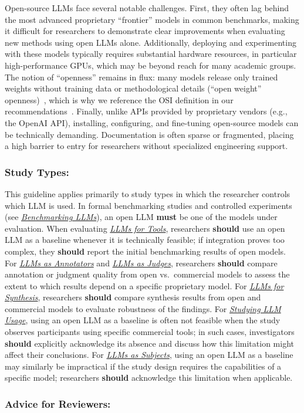 \documentclass[smallextended]{svjour3}
\newcommand{\must}{\textbf{must}\xspace}
\newcommand{\should}{\textbf{should}\xspace}
\newcommand{\annotators}{\hyperref[sec:llms-as-annotators]{\emph{LLMs as Annotators}}\xspace}
\newcommand{\judges}{\hyperref[sec:llms-as-judges]{\emph{LLMs as Judges}}\xspace}
\newcommand{\synthesis}{\hyperref[sec:llms-for-synthesis]{\emph{LLMs for Synthesis}}\xspace}
\newcommand{\subjects}{\hyperref[sec:llms-as-subjects]{\emph{LLMs as Subjects}}\xspace}
\newcommand{\llmusage}{\hyperref[sec:studying-llm-usage-in-software-engineering]{\emph{Studying LLM Usage}}\xspace}
\newcommand{\newtools}{\hyperref[sec:llms-for-new-software-engineering-tools]{\emph{LLMs for Tools}}\xspace}
\newcommand{\benchmarkingtasks}{\hyperref[sec:benchmarking-llms-for-software-engineering-tasks]{\emph{Benchmarking LLMs}}\xspace}
\newcommand{\annotators}{\href{/study-types\#llms-as-annotators}{\emph{LLMs as Annotators}}\xspace}
\newcommand{\judges}{\href{/study-types\#llms-as-judges}{\emph{LLMs as Judges}}\xspace}
\newcommand{\synthesis}{\href{/study-types\#llms-for-synthesis}{\emph{LLMs for Synthesis}}\xspace}
\newcommand{\subjects}{\href{/study-types\#llms-as-subjects}{\emph{LLMs as Subjects}}\xspace}
\newcommand{\llmusage}{\href{/study-types\#studying-llm-usage-in-software-engineering}{\emph{Studying LLM Usage}}\xspace}
\newcommand{\newtools}{\href{/study-types\#llms-for-new-software-engineering-tools}{\emph{LLMs for Tools}}\xspace}
\newcommand{\benchmarkingtasks}{\href{/study-types\#benchmarking-llms-for-software-engineering-tasks}{\emph{Benchmarking LLMs}}\xspace}
\newcommand{\guidelinesubsubsection}[1]{\subsubsection{\bfseries #1:}}
\newcommand{\guidelinesubsubsection}[1]{\subsubsection{#1}}
\begin{document}
Open-source LLMs face several notable challenges.
First, they often lag behind the most advanced proprietary ``frontier'' models in common benchmarks, making it difficult for researchers to demonstrate clear improvements when evaluating new methods using open LLMs alone.
Additionally, deploying and experimenting with these models typically requires substantial hardware resources, in particular high-performance GPUs, which may be beyond reach for many academic groups.
The notion of ``openness'' remains in flux: many models release only trained weights without training data or methodological details (``open weight'' openness)~\cite{Gibney2024}, which is why we reference the OSI definition in our recommendations~\cite{OSIAI2024}.
Finally, unlike APIs provided by proprietary vendors (e.g., the OpenAI API), installing, configuring, and fine-tuning open-source models can be technically demanding.
Documentation is often sparse or fragmented, placing a high barrier to entry for researchers without specialized engineering support.

\guidelinesubsubsection{Study Types}

This guideline applies primarily to study types in which the researcher controls which LLM is used.
In formal benchmarking studies and controlled experiments (see \benchmarkingtasks), an open LLM \must be one of the models under evaluation.
When evaluating \newtools, researchers \should use an open LLM as a baseline whenever it is technically feasible; if integration proves too complex, they \should report the initial benchmarking results of open models.
For \annotators and \judges, researchers \should compare annotation or judgment quality from open vs.\ commercial models to assess the extent to which results depend on a specific proprietary model.
For \synthesis, researchers \should compare synthesis results from open and commercial models to evaluate robustness of the findings.
For \llmusage, using an open LLM as a baseline is often not feasible when the study observes participants using specific commercial tools; in such cases, investigators \should explicitly acknowledge its absence and discuss how this limitation might affect their conclusions.
For \subjects, using an open LLM as a baseline may similarly be impractical if the study design requires the capabilities of a specific model; researchers \should acknowledge this limitation when applicable.

\guidelinesubsubsection{Advice for Reviewers}
\end{document}
